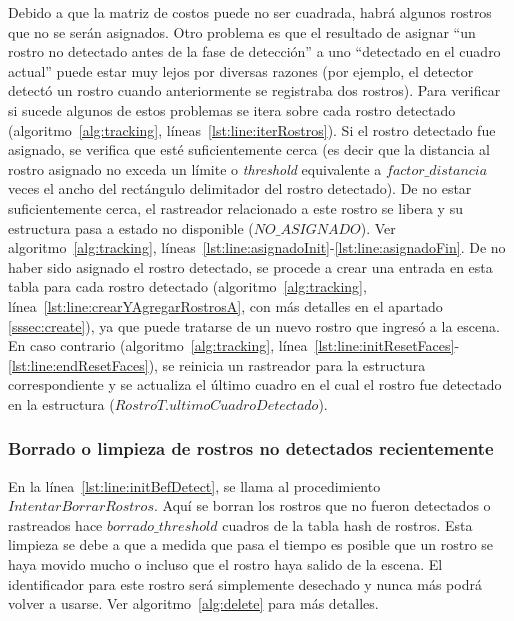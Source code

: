 \documentclass[a4paper,openright,12pt]{report}
\begin{document}
Debido a que la matriz de costos puede no ser cuadrada, habrá algunos rostros
que no se serán asignados. Otro problema es que el resultado de asignar ``un
rostro no detectado antes de la fase de detección'' a uno ``detectado en el
cuadro actual'' puede estar muy lejos por diversas razones (por ejemplo, el
detector detectó un rostro cuando anteriormente se registraba dos rostros). Para
verificar si sucede algunos de estos problemas se itera sobre cada rostro
detectado (algoritmo~\ref{alg:tracking}, líneas~\ref{lst:line:iterRostros}). Si
el rostro detectado fue asignado, se verifica que esté suficientemente cerca (es
decir que la distancia al rostro asignado no exceda un límite o
\textit{threshold} equivalente a $factor\_distancia$ veces el ancho del
rectángulo delimitador del rostro detectado). De no estar suficientemente cerca,
el rastreador relacionado a este rostro se libera y su estructura pasa a estado
no disponible ($NO\_ASIGNADO$). Ver algoritmo~\ref{alg:tracking},
líneas~\ref{lst:line:asignadoInit}-\ref{lst:line:asignadoFin}. De no haber sido
asignado el rostro detectado, se procede a crear una entrada en esta tabla para
cada rostro detectado (algoritmo~\ref{alg:tracking},
línea~\ref{lst:line:crearYAgregarRostrosA}, con más detalles en el apartado
\ref{sssec:create}), ya que puede tratarse de un nuevo rostro que ingresó a la
escena. En caso contrario (algoritmo~\ref{alg:tracking},
línea~\ref{lst:line:initResetFaces}-\ref{lst:line:endResetFaces}), se reinicia
un rastreador para la estructura correspondiente y se actualiza el último cuadro
en el cual el rostro fue detectado en la estructura
($RostroT.ultimoCuadroDetectado$).\\

\subsubsection{Borrado o limpieza de rostros no detectados recientemente}
En la línea~\ref{lst:line:initBefDetect}, se llama al procedimiento
$IntentarBorrarRostros$. Aquí se borran los rostros que no fueron detectados o
rastreados hace $borrado\_threshold$ cuadros de la tabla hash de rostros. Esta
limpieza se debe a que a medida que pasa el tiempo es posible que un rostro se
haya movido mucho o incluso que el rostro haya salido de la escena. El
identificador para este rostro será simplemente desechado y nunca más podrá
volver a usarse. Ver algoritmo~\ref{alg:delete} para más detalles.\\
\end{document}
